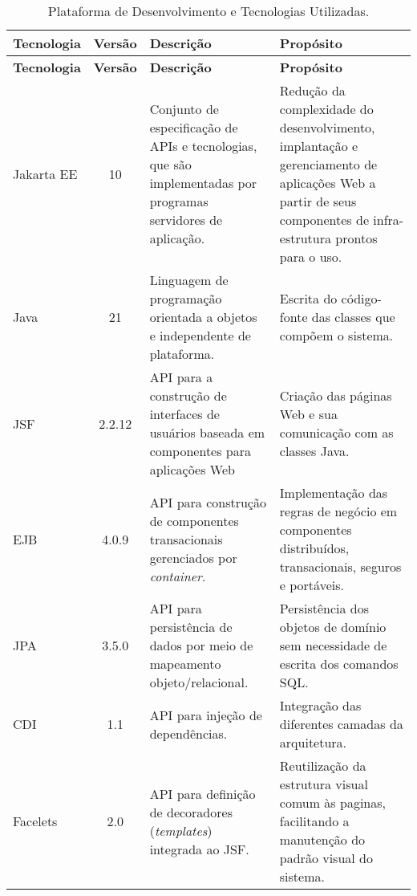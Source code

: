 \begin{footnotesize}
\begin{longtable}{|p{1.8cm}|c|p{5cm}|p{6.3cm}|}
	\caption{Plataforma de Desenvolvimento e Tecnologias Utilizadas.}	
	\label{tabela-plataforma}\\\hline

	\rowcolor{lightgray}
	\textbf{Tecnologia} & \textbf{Versão} & \textbf{Descrição} & \textbf{Propósito} \\\hline 
	\endfirsthead
	\hline
	\rowcolor{lightgray}
	\textbf{Tecnologia} & \textbf{Versão} & \textbf{Descrição} & \textbf{Propósito} \\\hline 
	\endhead
		
	Jakarta EE & 10 & Conjunto de especificação de APIs e tecnologias, que são implementadas por programas servidores de aplicação. & Redução da complexidade do desenvolvimento, implantação e gerenciamento de aplicações Web a partir de seus componentes de infra-estrutura prontos para o uso. \\ \hline

	Java & 21 & Linguagem de programação orientada a objetos e independente de plataforma. & Escrita do código-fonte das classes que compõem o sistema. \\\hline
	
	JSF & 2.2.12 & API para a construção de interfaces de usuários baseada em componentes para aplicações Web & Criação das páginas Web e sua comunicação com as classes Java.  \\\hline  
	
	EJB & 4.0.9 & API para construção de componentes transacionais gerenciados por \textit{container}. & Implementação das regras de negócio em componentes distribuídos, transacionais, seguros e portáveis. \\\hline
	
	JPA & 3.5.0 & API para persistência de dados por meio de mapeamento objeto/relacional. & Persistência dos objetos de domínio sem necessidade de escrita dos comandos SQL. \\\hline
	
	CDI & 1.1 & API para injeção de dependências. & Integração das diferentes camadas da arquitetura. \\\hline
	
	Facelets & 2.0 &  API para definição de decoradores (\textit{templates}) integrada ao JSF. & Reutilização da estrutura visual comum às paginas, facilitando a manutenção do padrão visual do sistema. \\\hline
	

\end{longtable}
\end{footnotesize}

